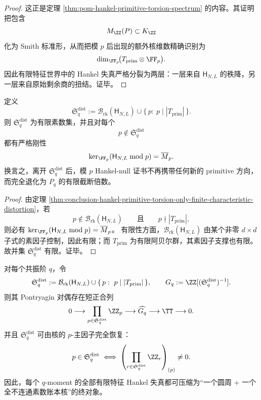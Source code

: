\begin{proof}
这正是定理 \ref{thm:pom-hankel-primitive-torsion-spectrum} 的内容。其证明把包含
\[
M_{\ZZ}(P)\subset K_{\ZZ}
\]
化为 Smith 标准形，从而把模 \(p\) 后出现的额外核维数精确识别为
\[
\dim_{\FF_p}\!\bigl(T_{\mathrm{prim}}\otimes\FF_p\bigr).
\]
因此有限特征世界中的 Hankel 失真严格分裂为两层：一层来自 \(\mathsf H_{N,L}\) 的秩降，另一层来自原始剩余商的扭结。证毕。
\end{proof}

\begin{corollary}[好素数刚性与失真素数集的有限性]\label{cor:conclusion-hankel-good-prime-rigidity-finite-distortion-support}
定义
\[
\mathfrak S_q^{\mathrm{dist}}
:=
\mathcal B_{\mathrm{rk}}(\mathsf H_{N,L})
\cup
\{\,p:\ p\mid |T_{\mathrm{prim}}|\,\}.
\]
则 \(\mathfrak S_q^{\mathrm{dist}}\) 为有限素数集，并且对每个
\[
p\notin \mathfrak S_q^{\mathrm{dist}}
\]
都有严格刚性
\[
\ker_{\FF_p}(\mathsf H_{N,L}\bmod p)=\overline M_p.
\]
换言之，离开 \(\mathfrak S_q^{\mathrm{dist}}\) 后，模 \(p\) Hankel-null 证书不再携带任何新的 primitive 方向，而完全退化为 \(P_q\) 的有限截断倍数。
\end{corollary}

\begin{proof}
由定理 \ref{thm:conclusion-hankel-primitive-torsion-only-finite-characteristic-distortion}，若
\[
p\notin \mathcal B_{\mathrm{rk}}(\mathsf H_{N,L})
\qquad\text{且}\qquad
p\nmid |T_{\mathrm{prim}}|,
\]
则必有 \(\ker_{\FF_p}(\mathsf H_{N,L}\bmod p)=\overline M_p\)。
有限性方面，\(\mathcal B_{\mathrm{rk}}(\mathsf H_{N,L})\) 由某个非零 \(d\times d\) 子式的素因子控制，因此有限；而 \(T_{\mathrm{prim}}\) 为有限阿贝尔群，其素因子支撑也有限。故并集 \(\mathfrak S_q^{\mathrm{dist}}\) 有限。证毕。
\end{proof}

\begin{theorem}\label{thm:conclusion-hankel-single-circle-prime-ledger-terminal-object}
对每个共振阶 \(q\)，令
\[
\mathfrak S_q^{\mathrm{dist}}
:=
\mathcal B_{\mathrm{rk}}(\mathsf H_{N,L})
\cup
\{\,p:\ p\mid |T_{\mathrm{prim}}|\,\},
\qquad
G_q:=\ZZ[(\mathfrak S_q^{\mathrm{dist}})^{-1}].
\]
则其 Pontryagin 对偶存在短正合列
\[
0\longrightarrow \prod_{p\in \mathfrak S_q^{\mathrm{dist}}}\ZZ_p
\longrightarrow \widehat{G_q}
\longrightarrow \TT
\longrightarrow 0.
\]
并且 \(\mathfrak S_q^{\mathrm{dist}}\) 可由核的 \(p\)-主因子完全恢复：
\[
p\in \mathfrak S_q^{\mathrm{dist}}
\iff
\left(\prod_{r\in \mathfrak S_q^{\mathrm{dist}}}\ZZ_r\right)_{(p)}\neq 0.
\]
因此，每个 \(q\)-moment 的全部有限特征 Hankel 失真都可压缩为“一个圆周 + 一个全不连通素数账本核”的终对象。
\end{theorem}

